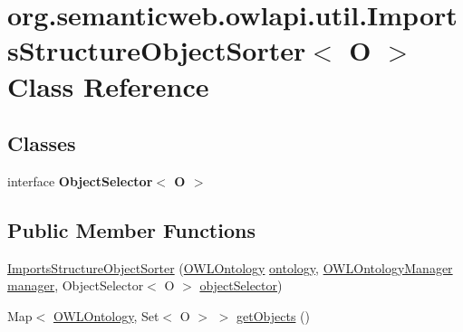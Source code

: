 \hypertarget{classorg_1_1semanticweb_1_1owlapi_1_1util_1_1_imports_structure_object_sorter_3_01_o_01_4}{\section{org.\-semanticweb.\-owlapi.\-util.\-Imports\-Structure\-Object\-Sorter$<$ O $>$ Class Reference}
\label{classorg_1_1semanticweb_1_1owlapi_1_1util_1_1_imports_structure_object_sorter_3_01_o_01_4}
}
\subsection*{Classes}
\begin{DoxyCompactItemize}
\item 
interface {\bfseries Object\-Selector$<$ O $>$}
\end{DoxyCompactItemize}
\subsection*{Public Member Functions}
\begin{DoxyCompactItemize}
\item 
\hyperlink{classorg_1_1semanticweb_1_1owlapi_1_1util_1_1_imports_structure_object_sorter_3_01_o_01_4_afcd728499f596f4748b53f0786717c46}{Imports\-Structure\-Object\-Sorter} (\hyperlink{interfaceorg_1_1semanticweb_1_1owlapi_1_1model_1_1_o_w_l_ontology}{O\-W\-L\-Ontology} \hyperlink{classorg_1_1semanticweb_1_1owlapi_1_1util_1_1_imports_structure_object_sorter_3_01_o_01_4_a466a7e19b6fa657a7079ec9ed7860bf7}{ontology}, \hyperlink{interfaceorg_1_1semanticweb_1_1owlapi_1_1model_1_1_o_w_l_ontology_manager}{O\-W\-L\-Ontology\-Manager} \hyperlink{classorg_1_1semanticweb_1_1owlapi_1_1util_1_1_imports_structure_object_sorter_3_01_o_01_4_ad8a5c404d626fa738269445cabeff0ab}{manager}, Object\-Selector$<$ O $>$ \hyperlink{classorg_1_1semanticweb_1_1owlapi_1_1util_1_1_imports_structure_object_sorter_3_01_o_01_4_a077c2ab985aad81ca5611731ccfcda4a}{object\-Selector})
\item 
Map$<$ \hyperlink{interfaceorg_1_1semanticweb_1_1owlapi_1_1model_1_1_o_w_l_ontology}{O\-W\-L\-Ontology}, Set$<$ O $>$ $>$ \hyperlink{classorg_1_1semanticweb_1_1owlapi_1_1util_1_1_imports_structure_object_sorter_3_01_o_01_4_af5eec164b1d5c8969673ecbc45ce8165}{get\-Objects} ()
\end{DoxyCompactItemize}
